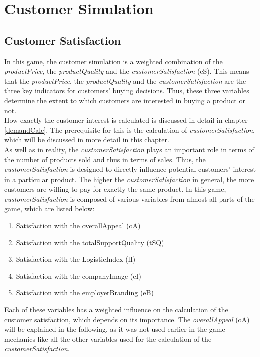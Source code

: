 \section{Customer Simulation}
\label{sec:customsim}
\subsection{Customer Satisfaction}
In this game, the customer simulation is a weighted combination of the \textit{productPrice}, the \textit{productQuality} and the \textit{customerSatisfaction} (\gls{cS}).
This means that the \textit{productPrice}, the \textit{productQuality} and the \textit{customerSatisfaction} are the three key indicators for customers' buying decisions. Thus, these three variables determine the extent to which customers are interested in buying a product or not.\\
How exactly the customer interest is calculated is discussed in detail in chapter \ref{demandCalc}. The prerequisite for this is the calculation of \textit{customerSatisfaction}, which will be discussed in more detail in this chapter.\\
As well as in reality, the \textit{customerSatisfaction} plays an important role in terms of the number of products sold and thus in terms of sales. \cite{deptolla_effects_2004}
Thus, the \textit{customerSatisfaction} is designed to directly influence potential customers' interest in a particular product. The higher the \textit{customerSatisfaction} in general, the more customers are willing to pay for exactly the same product. 
In this game, \textit{customerSatisfaction} is composed of various variables from almost all parts of the game, which are listed below:
\begin{enumerate}
      \item Satisfaction with the overallAppeal (oA)
      \item Satisfaction with the totalSupportQuality (tSQ)
      \item Satisfaction with the LogisticIndex (lI)
      \item Satisfaction with the companyImage (cI)
      \item Satisfaction with the employerBranding (eB)
\end{enumerate}
Each of these variables has a weighted influence on the calculation of the customer satisfaction, which depends on its importance.
The \textit{overallAppeal} (oA) will be explained in the following, as it was not used earlier in the game mechanics like all the other variables used for the calculation of the \textit{customerSatisfaction}.


